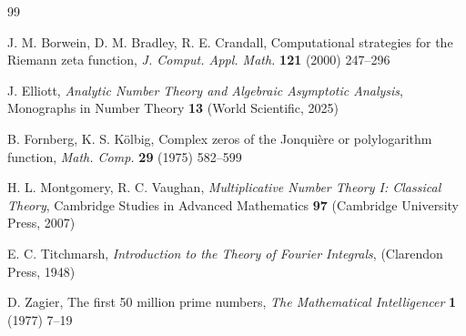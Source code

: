 \documentclass[a4paper,10pt]{amsart}
\theoremstyle{definition}
\numberwithin{equation}{section}
\begin{document}
\begin{thebibliography}{99}

 J. M. Borwein, D. M. Bradley, R. E. Crandall, Computational strategies for the Riemann zeta function, \emph{J. Comput. Appl. Math.} \textbf{121} (2000) 247--296

 J. Elliott, \emph{Analytic Number Theory and Algebraic Asymptotic Analysis}, Monographs in Number Theory {\bf 13} (World Scientific, 2025)

 B. Fornberg, K. S. K\"olbig, Complex zeros of the Jonqui\`ere or polylogarithm function, {\it Math. Comp.} {\bf 29} (1975) 582--599

 H. L. Montgomery, R. C. Vaughan, \emph{Multiplicative Number Theory I: Classical Theory}, Cambridge Studies in Advanced Mathematics {\bf 97} (Cambridge University Press, 2007)

 E. C. Titchmarsh, \emph{Introduction to the Theory of Fourier Integrals}, (Clarendon Press, 1948)

 D. Zagier, The first 50 million prime numbers, \emph{The Mathematical Intelligencer} \textbf{1} (1977) 7--19

\end{thebibliography}
\end{document}
